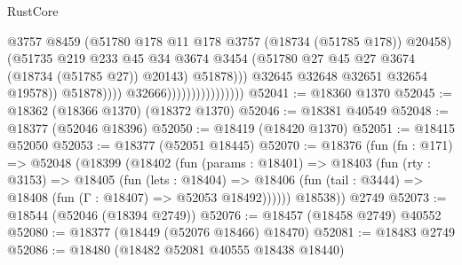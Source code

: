 \begin{lexlean}{RustCore}
\begin{coremodule}
                                                    @3757
                                                    @8459
                                                    (@51780
                                                      @178
                                                      @11
                                                      @178
                                                      @3757
                                                      (@18734 (@51785 @178))
                                                      @20458)
                                                    (@51735
                                                      @219
                                                      @233
                                                      @45
                                                      @34
                                                      @3674
                                                      @3454
                                                      (@51780
                                                        @27
                                                        @45
                                                        @27
                                                        @3674
                                                        (@18734 (@51785 @27))
                                                        @20143)
                                                      @51878)))
                                                @32645
                                                @32648
                                                @32651
                                                @32654
                                                @19578))
                                            @51878))))
                                    @32666))))))))))))))))
@52041 := @18360 @1370
@52045 := @18362 (@18366 @1370) (@18372 @1370)
@52046 := @18381 @40549
@52048 := @18377 (@52046 @18396)
@52050 := @18419 (@18420 @1370)
@52051 := @18415 @52050
@52053 := @18377 (@52051 @18445)
@52070 := @18376
    (fun (fn : @171) =>
    @52048
      (@18399
        (@18402
          (fun (params : @18401) =>
          @18403
            (fun (rty : @3153) =>
            @18405
              (fun (lets : @18404) =>
              @18406 (fun (tail : @3444) => @18408 (fun (Γ : @18407) => @52053 @18492))))))
        @18538))
    @2749
@52073 := @18544 (@52046 (@18394 @2749))
@52076 := @18457 (@18458 @2749) @40552
@52080 := @18377 (@18449 (@52076 @18466) @18470)
@52081 := @18483 @2749
@52086 := @18480 (@18482 @52081 @40555 @18438 @18440)

\end{coremodule}
\end{lexlean}

